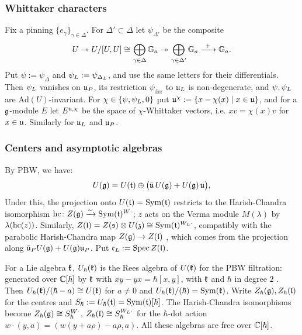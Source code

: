 \documentclass{article}
\theoremstyle{plain}
\theoremstyle{definition}
\theoremstyle{remark}
\numberwithin{equation}{section}
\begin{document}
\subsubsection*{Whittaker characters}
Fix a pinning $\{e_\gamma\}_{\gamma\in\Delta}$. For $\Delta'\subset\Delta$ let $\psi_{\Delta'}$ be the composite
\begin{equation}\label{eq:psi-def}
U\twoheadrightarrow U/[U,U]\cong\bigoplus_{\gamma\in\Delta}\bbG_a\twoheadrightarrow\bigoplus_{\gamma\in\Delta'}\bbG_a\xrightarrow{\ +\ }\bbG_a .
\end{equation}
Put $\psi:=\psi_\Delta$ and $\psi_L:=\psi_{\Delta_L}$, and use the same letters for their differentials. Then $\psi_L$ vanishes on $\mathfrak{u}_P$, its restriction $\psi_{\mathrm{der}}$ to $\mathfrak{u}_L$ is non-degenerate, and $\psi,\psi_L$ are $\mathrm{Ad}(U)$-invariant. For $\chi\in\{\psi,\psi_L,0\}$ put $\mathfrak{u}^{\chi}:=\{x-\chi(x)\mid x\in\mathfrak{u}\}$, and for a $\mathfrak{g}$-module $E$ let $E^{\mathfrak{u},\chi}$ be the space of $\chi$-Whittaker vectors, i.e. $xv=\chi(x)v$ for $x\in\mathfrak{u}$. Similarly for $\mathfrak{u}_L$ and $\mathfrak{u}_P$.

\subsubsection*{Centers and asymptotic algebras}
By PBW, we have:
\begin{equation}\label{eq:HC-decomp}
U(\mathfrak{g})=U(\mathfrak{t})\oplus\bigl(\bar{\mathfrak{u}}\,U(\mathfrak{g})+U(\mathfrak{g})\,\mathfrak{u}\bigr),
\end{equation}
Under this, the projection onto $U(\mathfrak{t})=\operatorname{Sym}(\mathfrak{t})$ restricts to the Harish-Chandra isomorphism $\operatorname{hc}\colon Z(\mathfrak{g})\xrightarrow{\sim}\operatorname{Sym}(\mathfrak{t})^{W\cdot}$; $z$ acts on the Verma module $M(\lambda)$ by $\lambda(\operatorname{hc}(z))$. Similarly, $Z(\mathfrak{l})=Z(\mathfrak{s})\otimes U(\mathfrak{z})\cong\operatorname{Sym}(\mathfrak{t})^{W_L\cdot}$, compatibly with the parabolic Harish-Chandra map $Z(\mathfrak{g})\to Z(\mathfrak{l})$ , which comes from the projection along $\bar{\mathfrak{u}}_PU(\mathfrak{g})+U(\mathfrak{g})\mathfrak{u}_P$. Put $\mathfrak{c}_L:=\operatorname{Spec} Z(\mathfrak{l})$.

For a Lie algebra $\mathfrak{k}$, $U_\hbar(\mathfrak{k})$ is the Rees algebra of $U(\mathfrak{k})$ for the PBW filtration: generated over $\mathbb{C}[\hbar]$ by $\mathfrak{k}$ with $xy-yx=\hbar[x,y]$, with $\mathfrak{k}$ and $\hbar$ in degree $2$ \cite[\S2.1]{ginzburg2014differentialoperatorsguaffine}. Then $U_\hbar(\mathfrak{k})/(\hbar-a)\cong U(\mathfrak{k})$ for $a\neq0$ and $U_\hbar(\mathfrak{k})/(\hbar)=\operatorname{Sym}(\mathfrak{k})$. Write $Z_\hbar(\mathfrak{g}),Z_\hbar(\mathfrak{l})$ for the centres and $S_\hbar:=U_\hbar(\mathfrak{t})=\operatorname{Sym}(\mathfrak{t})[\hbar]$. The Harish-Chandra isomorphisms become $Z_\hbar(\mathfrak{g})\cong S_\hbar^{W\cdot}$, $Z_\hbar(\mathfrak{l})\cong S_\hbar^{W_L\cdot}$ for the $\hbar$-dot action $w\cdot(y,a)=(w(y+a\rho)-a\rho,a)$. All these algebras are free over $\mathbb{C}[\hbar]$. 
\end{document}
